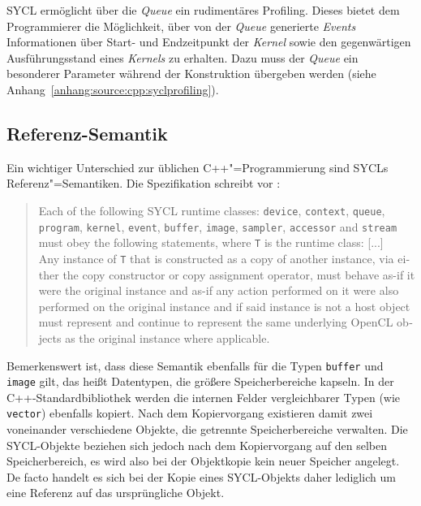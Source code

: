 SYCL ermöglicht über die \textit{Queue} ein rudimentäres Profiling. Dieses
bietet dem Programmierer die Möglichkeit, über von der \textit{Queue} generierte
\textit{Events} Informationen über Start- und Endzeitpunkt der \textit{Kernel} sowie den
gegenwärtigen Ausführungsstand eines \textit{Kernels} zu erhalten. Dazu muss der
\textit{Queue} ein besonderer Parameter während der Konstruktion übergeben
werden (siehe Anhang~\ref{anhang:source:cpp:syclprofiling}).

\subsection{Referenz-Semantik}

Ein wichtiger Unterschied zur üblichen C++"=Programmierung sind SYCLs
Referenz"=Semantiken. Die Spezifikation schreibt vor
\cite[siehe][Abschnitt 4.3.2]{sycl2019}:
\begin{otherlanguage}{english}
    \begin{quote}
        Each of the following SYCL runtime classes: \texttt{device},
        \texttt{context}, \texttt{queue}, \texttt{program}, \texttt{kernel},
        \texttt{event}, \texttt{buffer}, \texttt{image}, \texttt{sampler},
        \texttt{accessor} and \texttt{stream} must obey the following
        statements, where \texttt{T} is the runtime class: [...]
        \\
        Any instance of \texttt{T} that is constructed as a copy of another
        instance, via either the copy constructor or copy assignment operator,
        must behave as-if it were the original instance and as-if any action
        performed on it were also performed on the original instance and if said
        instance is not a host object must represent and continue to represent
        the same underlying OpenCL objects as the original instance where
        applicable.
    \end{quote}
\end{otherlanguage}
Bemerkenswert ist, dass diese Semantik ebenfalls für die Typen \texttt{buffer}
und \texttt{image} gilt, das heißt Datentypen, die größere Speicherbereiche
kapseln. In der C++-Standardbibliothek werden die internen Felder vergleichbarer
Typen (wie \texttt{vector}) ebenfalls kopiert. Nach dem Kopiervorgang existieren
damit zwei voneinander verschiedene Objekte, die getrennte Speicherbereiche
verwalten. Die SYCL-Objekte beziehen sich jedoch nach dem Kopiervorgang auf den
selben Speicherbereich, es wird also bei der Objektkopie kein neuer Speicher
angelegt. De facto handelt es sich bei der Kopie eines SYCL-Objekts daher
lediglich um eine Referenz auf das ursprüngliche Objekt.

